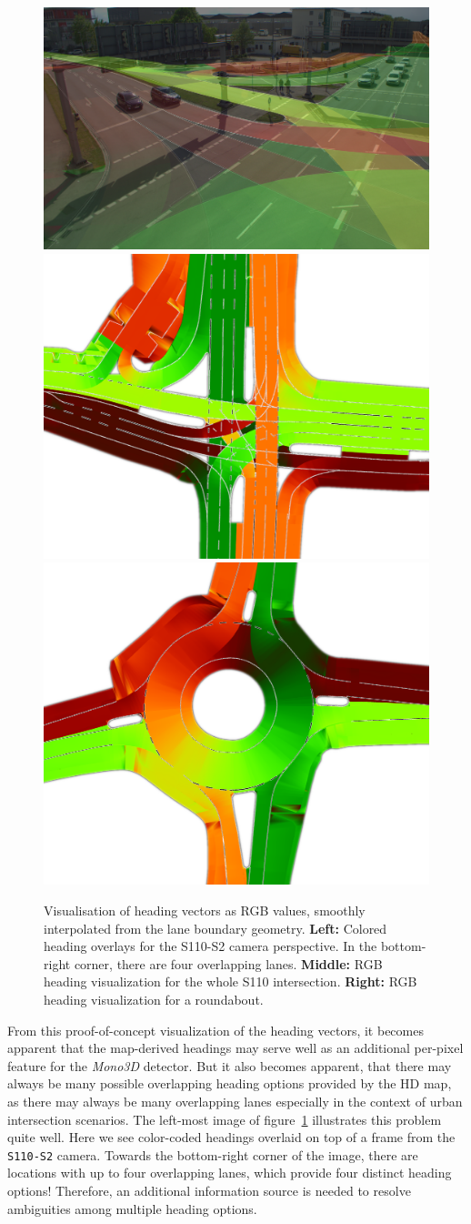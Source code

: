 \begin{figure}[htb]
    \includegraphics[width=0.4\linewidth]{figures/headings-colored-s2} %
    \includegraphics[width=0.29\linewidth]{figures/hdmap-heading-s110}
    \includegraphics[width=0.29\linewidth]{figures/hdmap-heading-roundabout} %
    \caption{Visualisation of heading vectors as RGB values, smoothly interpolated from the lane boundary geometry. \textbf{Left:} Colored heading overlays for the S110-S2 camera perspective. In the bottom-right corner, there are four overlapping lanes. \textbf{Middle:} RGB heading visualization for the whole S110 intersection. \textbf{Right:} RGB heading visualization for a roundabout.}
    \label{fig:headings-color-coded}
\end{figure}

From this proof-of-concept visualization of the heading vectors, it becomes apparent that the map-derived headings may serve well as an additional per-pixel feature for the \textit{Mono3D} detector.
But it also becomes apparent, that there may always be many possible overlapping heading options provided by the HD map, as there may always be many overlapping lanes \textemdash especially in the context of urban intersection scenarios.
The left-most image of figure~\ref{fig:headings-color-coded} illustrates this problem quite well.
Here we see color-coded headings overlaid on top of a frame from the \texttt{S110-S2} camera.
Towards the bottom-right corner of the image, there are locations with up to four overlapping lanes, which provide four distinct heading options!
Therefore, an additional information source is needed to resolve ambiguities among multiple heading options.

